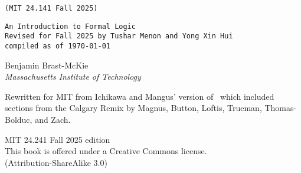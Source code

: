 
\thispagestyle{empty}
{\Huge\forallx} \hfill {\LARGE \texttt{(MIT 24.141 Fall 2025)}} %

{\tt An Introduction to Formal Logic\\
Revised for Fall 2025 by Tushar Menon and Yong Xin Hui\\ compiled as of \today}


\vspace{.5in}



{\sf Benjamin Brast-McKie}\\
\emph{Massachusetts Institute of Technology}




{\sf Rewritten for MIT from Ichikawa and Mangus' version of \forallx\ which included sections from the Calgary Remix by Magnus, Button, Loftis, Trueman, Thomas-Bolduc, and Zach.}





\vfill




{\sf
	MIT 24.241 Fall 2025 edition \\%
	This book is offered under a Creative Commons license.\\
	(Attribution-ShareAlike 3.0)
}



\newpage
\thispagestyle{empty}%


%

